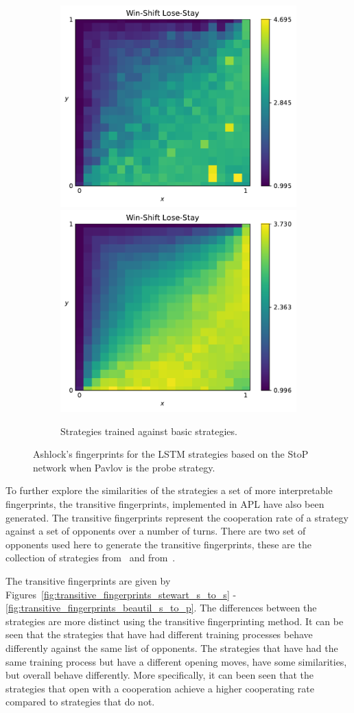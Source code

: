 \begin{figure}[!htbp]
\begin{subfigure}{\textwidth}
        \includegraphics[width=.3\textwidth]{src/chapters/07/img/win_shift_lose_stay_basic_classification_1.pdf}
        \includegraphics[width=.3\textwidth]{src/chapters/07/img/win_shift_lose_stay_basic_classification_0_78.pdf}
        \caption{Strategies trained against basic strategies.}
    \end{subfigure}
    \caption{Ashlock's fingerprints for the LSTM strategies based on the StoP
    network when Pavlov is the probe strategy.}\label{fig:ashlock_fingerprints_pavlov_s_to_p}
\end{figure}

To further explore the similarities of the strategies a set of more
interpretable fingerprints, the transitive fingerprints, implemented in APL have
also been generated. The transitive fingerprints represent the cooperation rate
of a strategy against a set of opponents over a number of turns. There are two
set of opponents used here to generate the transitive fingerprints, these are
the collection of strategies from~\cite{Stewart2012} and
from~\cite{Beaufils1997}.

The transitive fingerprints are given by
Figures~\ref{fig:transitive_fingerprints_stewart_s_to_s}
-\ref{fig:transitive_fingerprints_beautil_s_to_p}. The differences between the
strategies are more distinct using the transitive fingerprinting method. It can
be seen that the strategies that have had different training processes behave
differently against the same list of opponents. The strategies that have had the
same training process but have a different opening moves, have some
similarities, but overall behave differently. More specifically, it can been
seen that the strategies that open with a cooperation achieve a higher
cooperating rate compared to strategies that do not.

